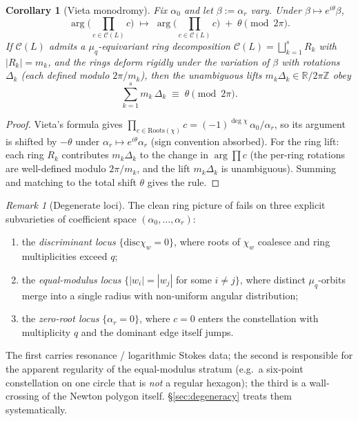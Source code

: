 \documentclass[11pt,a4paper]{article}
\theoremstyle{plain}
\newtheorem{corollary}[theorem]{Corollary}
\theoremstyle{definition}
\theoremstyle{remark}
\newtheorem{remark}[theorem]{Remark}
\newcommand{\Roots}{\mathrm{Roots}}
\newcommand{\Cl}{\mathcal{C}}
\newcommand{\disc}{\mathrm{disc}}
\DeclareMathOperator{\arginline}{arg}
\begin{document}
\begin{corollary}[Vieta monodromy]\label{cor:vieta}
Fix $\alpha_0$ and let $\beta := \alpha_r$ vary. Under $\beta \mapsto
e^{i\theta} \beta$,
\[
   \arginline\!\Big(\prod_{c \in \Cl(L)} c\Big)
   \;\longmapsto\;
   \arginline\!\Big(\prod_{c \in \Cl(L)} c\Big) \;+\; \theta \pmod{2\pi}.
\]
If $\Cl(L)$ admits a $\mu_q$-equivariant ring decomposition
$\Cl(L) = \bigsqcup_{k=1}^{s} R_k$ with $|R_k| = m_k$, and the rings deform
rigidly under the variation of $\beta$ with rotations $\Delta_k$ (each
defined modulo $2\pi / m_k$), then the unambiguous lifts $m_k \Delta_k \in
\mathbb{R}/2\pi\mathbb{Z}$ obey
\[
   \sum_{k=1}^{s} m_k\, \Delta_k \;\equiv\; \theta \pmod{2\pi}.
\]
\end{corollary}

\begin{proof}
Vieta's formula gives $\prod_{c \in \Roots(\chi)} c = (-1)^{\deg \chi}\,
\alpha_0 / \alpha_r$, so its argument is shifted by $-\theta$ under
$\alpha_r \mapsto e^{i\theta} \alpha_r$ (sign convention absorbed). For the
ring lift: each ring $R_k$ contributes $m_k \Delta_k$ to the change in
$\arginline \prod c$ (the per-ring rotations are well-defined modulo
$2\pi/m_k$, and the lift $m_k \Delta_k$ is unambiguous). Summing and
matching to the total shift $\theta$ gives the rule.
\end{proof}

\begin{remark}[Degenerate loci]\label{rem:degenerate}
The clean ring picture of  fails on three explicit
subvarieties of coefficient space $(\alpha_0, \dots, \alpha_r)$:
\begin{enumerate}[label=(\roman*)]
\item the \emph{discriminant locus} $\{\disc \chi_w = 0\}$, where roots of
      $\chi_w$ coalesce and ring multiplicities exceed $q$;
\item the \emph{equal-modulus locus} $\{|w_i| = |w_j|$ for some $i \ne j\}$,
      where distinct $\mu_q$-orbits merge into a single radius with
      non-uniform angular distribution;
\item the \emph{zero-root locus} $\{\alpha_r = 0\}$, where $c = 0$ enters
      the constellation with multiplicity $q$ and the dominant edge itself
      jumps.
\end{enumerate}
The first carries resonance / logarithmic Stokes data; the second is
responsible for the apparent regularity of the
equal-modulus stratum (e.g.\ a six-point constellation on one circle
that is \emph{not} a regular hexagon); the third is a wall-crossing of
the Newton
polygon itself. \S\ref{sec:degeneracy} treats them systematically.
\end{remark}
\end{document}
